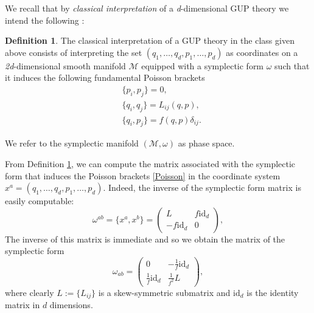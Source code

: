 \documentclass{article}
\numberwithin{equation}{section}
\theoremstyle{definition}
\newtheorem{definition}[theorem]{Definition}
\newcommand{\M}{\mathcal{M}}
\begin{document}
 We recall that by \emph{classical interpretation} of a \emph{d}-dimensional GUP theory we intend the following \cite{Bruno_Segreto_2024}:
 \begin{definition}
 \label{class}
    The classical interpretation of a GUP theory in the class given above consists of interpreting the set $(q_1,\dots,q_d,p_1,\dots,p_d)$ as coordinates on a \emph{2d}-dimensional smooth manifold $\M$ equipped with a symplectic form $\omega$ such that it induces the following fundamental Poisson brackets
    \begin{align}
    \label{Poisson}
    \nonumber
    &\{ p_i, p_j\}=0,\\
    &\{ q_i, q_j\}= L_{ij}(q,p),\\ \nonumber  
    &\{ q_i,p_j\}=f(q,p)\delta_{ij}.
    \end{align}
    
    We refer to the symplectic manifold $(\M,\omega)$ as phase space.
 \end{definition}
  From Definition \ref{class}, we can compute the matrix associated with the symplectic form that induces the Poisson brackets \eqref{Poisson} in the coordinate system $x^a=(q_1,\dots,q_d,p_1,\dots,p_d)$. Indeed, the inverse of the symplectic form matrix is easily computable:
 \begin{equation}
 \label{PoissonMat}
   \omega^{ab}=\{x^a,x^b\}=
   \begin{pmatrix}
    L & f\mathrm{id}_d\\
    -f\mathrm{id}_d & 0
   \end{pmatrix},
 \end{equation}
 The inverse of this matrix is immediate and so we obtain the matrix of the symplectic form
 \begin{equation}
 \label{Sp-form}
  \omega_{ab}=
  \begin{pmatrix}
    0 & -\frac{1}{f}\mathrm{id}_d\\
    \frac{1}{f}\mathrm{id}_d & \frac{1}{f^2}L
  \end{pmatrix},
 \end{equation}
 where clearly $L:=\{L_{ij}\}$ is a skew-symmetric submatrix and $\mathrm{id}_d$ is the identity matrix in $d$ dimensions.
 
\smallskip
\end{document}
